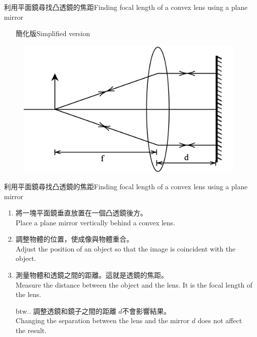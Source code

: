 \documentclass[beamer=true]{standalone}
\begin{document}
\begin{frame}{利用平面鏡尋找凸透鏡的焦距Finding focal length of a convex lens using a plane mirror}
    \begin{itemize}
        \item [] 簡化版Simplified version
    \end{itemize}
    \begin{figure}
        \centering
        \includegraphics[width=0.75\linewidth]{../../assets/udhe08dnue8983.png}
    \end{figure}
\end{frame}

\begin{frame}{利用平面鏡尋找凸透鏡的焦距Finding focal length of a convex lens using a plane mirror}
    \begin{enumerate}
        \setlength{\itemsep}{.6em}
        \item 將一塊平面鏡垂直放置在一個凸透鏡後方。\\Place a plane mirror vertically behind a convex lens.
        \item 調整物體的位置，使成像與物體重合。\\Adjust the position of an object so that the image is coincident with the object.
        \item 測量物體和透鏡之間的距離。這就是透鏡的焦距。\\Measure the distance between the object and the lens. It is the focal length of the lens.
    \end{enumerate}
    \begin{itemize}
        \item [btw..] 調整透鏡和鏡子之間的距離 $d$不會影響結果。\\Changing the separation between the lens and the mirror $d$ does not affect the result.
    \end{itemize}
\end{frame}
\end{document}
